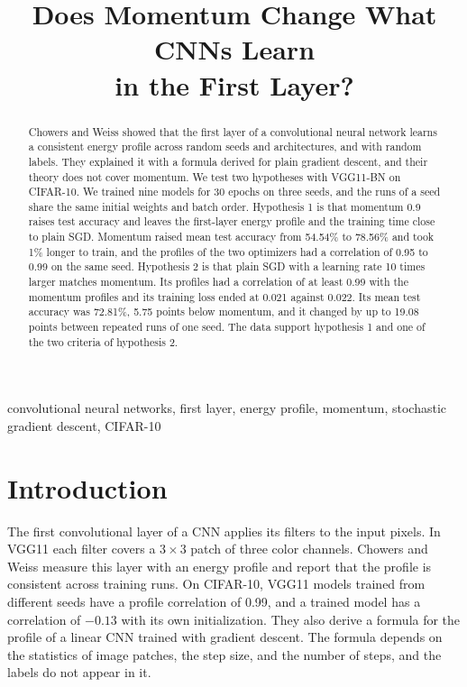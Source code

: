 \documentclass[conference]{IEEEtran}
\title{Does Momentum Change What CNNs Learn\\in the First Layer?}
\author{\IEEEauthorblockN{Markus Massina}
\IEEEauthorblockA{Binghamton University\\
GitHub: Markus112105}
\and
\IEEEauthorblockN{Michael Truong}
\IEEEauthorblockA{Binghamton University\\
GitHub: Michael-Truong111}}
\begin{document}
\maketitle

\begin{abstract}
Chowers and Weiss showed that the first layer of a convolutional neural
network learns a consistent energy profile across random seeds and
architectures, and with random labels. They explained it with a formula
derived for plain gradient descent, and their theory does not cover momentum.
We test two hypotheses with VGG11-BN on CIFAR-10. We trained nine models for
30 epochs on three seeds, and the runs of a seed share the same initial
weights and batch order. Hypothesis 1 is that momentum 0.9 raises test
accuracy and leaves the first-layer energy profile and the training time close
to plain SGD. Momentum raised mean test accuracy from 54.54\% to 78.56\% and
took 1\% longer to train, and the profiles of the two optimizers had a
correlation of 0.95 to 0.99 on the same seed. Hypothesis 2 is that plain SGD
with a learning rate 10 times larger matches momentum. Its profiles had a
correlation of at least 0.99 with the momentum profiles and its training loss
ended at 0.021 against 0.022. Its mean test accuracy was 72.81\%, 5.75 points below
momentum, and it changed by up to 19.08 points between repeated runs of one
seed. The data support hypothesis 1 and one of the two criteria of
hypothesis 2.
\end{abstract}

\begin{IEEEkeywords}
convolutional neural networks, first layer, energy profile, momentum,
stochastic gradient descent, CIFAR-10
\end{IEEEkeywords}

\section{Introduction}
The first convolutional layer of a CNN applies its filters to the input
pixels. In VGG11 each filter covers a $3\times3$ patch of three color
channels. Chowers and Weiss \cite{chowers2023} measure this layer with an
energy profile and report that the profile is consistent across training
runs. On CIFAR-10, VGG11 models trained from different seeds have a
profile correlation of 0.99, and a trained model has a correlation of $-0.13$
with its own initialization. They also derive a formula for the profile of a
linear CNN trained with gradient descent. The formula depends on the
statistics of image patches, the step size, and the number of steps, and the
labels do not appear in it.
\end{document}

